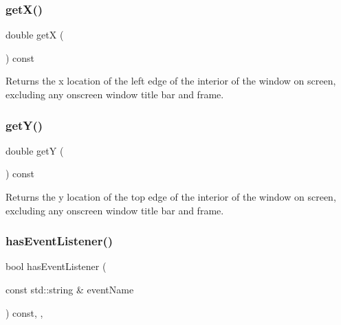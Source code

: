 \subsubsection{\texorpdfstring{get\+X()}{getX()}}
{\footnotesize\ttfamily double getX (\begin{DoxyParamCaption}{ }\end{DoxyParamCaption}) const\hspace{0.3cm}{\ttfamily [virtual]}}



Returns the x location of the left edge of the interior of the window on screen, excluding any onscreen window title bar and frame. 

\mbox{\label{classsgl_1_1GWindow_aafa51c7f8f38a09febbb9ce7853f77b4}} 
\subsubsection{\texorpdfstring{get\+Y()}{getY()}}
{\footnotesize\ttfamily double getY (\begin{DoxyParamCaption}{ }\end{DoxyParamCaption}) const\hspace{0.3cm}{\ttfamily [virtual]}}



Returns the y location of the top edge of the interior of the window on screen, excluding any onscreen window title bar and frame. 

\mbox{\label{classsgl_1_1GObservable_a9f6faaa25942923bafa1c44020c49fa9}} 
\subsubsection{\texorpdfstring{has\+Event\+Listener()}{hasEventListener()}}
{\footnotesize\ttfamily bool has\+Event\+Listener (\begin{DoxyParamCaption}\item[{const std\+::string \&}]{event\+Name }\end{DoxyParamCaption}) const\hspace{0.3cm}{\ttfamily [protected]}, {\ttfamily [virtual]}, {\ttfamily [inherited]}}



